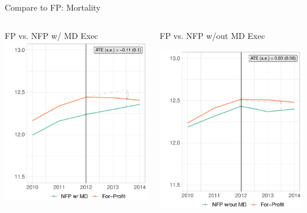 \documentclass[notes,11pt, aspectratio=169]{beamer}
\begin{document}
\begin{frame}{Compare to FP: Mortality}
\begin{columns}
    \begin{column}{0.5\textwidth}
        \centering
        FP vs. NFP w/ MD Exec\\\vspace{2mm}
        \includegraphics[width=.75\textwidth]{Objects/mort_fp_md_synth_graph.pdf}
    \end{column}
        \begin{column}{0.5\textwidth}
        \centering
        FP vs. NFP w/out MD Exec

        \vspace{2mm}
        \includegraphics[width=.75\textwidth]{Objects/mort_fp_nomd_synth_graph.pdf}
    \end{column}
\end{columns}
\end{frame}
\end{document}
